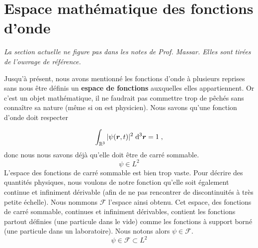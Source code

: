 \documentclass[../notesdecours.tex]{subfiles}
\begin{document}
\section{Espace mathématique des fonctions d'onde}
\label{Espace mathématique des fonctions d'onde}
\begin{center}
\textit{La section actuelle ne figure pas dans les notes de Prof. Massar. Elles sont tirées de l'ouvrage de référence.}
\end{center}
Jusqu'à présent, nous avons mentionné les fonctions d'onde à plusieurs reprises sans nous être définis un \textbf{espace de fonctions} auxquelles elles appartiennent. Or c'est un objet mathématique, il ne faudrait pas commettre trop de pêchés sans connaître sa nature (même si on est physicien). Nous savons qu'une fonction d'onde doit respecter 

$$ \int_{\mathbb R ^3} |\psi(\bm{r}, t)| ^2 \; \mathrm{d} ^3 \bm{r} = 1 \; ,$$
donc nous nous savons déjà qu'elle doit être de carré sommable.
$$\psi \in L^2$$
L'espace des fonctions de carré sommable est bien trop vaste. Pour décrire des quantités physiques, nous voulons de notre fonction qu'elle soit également continue et infiniment dérivable (afin de ne pas rencontrer de discontinuités à très petite échelle). Nous nommons $\mathcal F$ l'espace ainsi obtenu. Cet espace, des fonctions de carré sommable, continues et infiniment dérivables, contient les fonctions partout définies (une particule dans le vide) comme les fonctions à support borné (une particule dans un laboratoire). Nous notons alors $\psi \in \mathcal{F}$.
$$\psi \in \mathcal{F} \subset L^2$$
\end{document}
